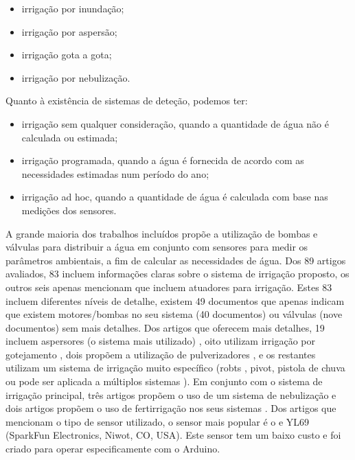 \documentclass[conference]{IEEEtran}
\begin{document}
\begin{itemize}
\item irrigação por inundação;
\item irrigação por aspersão;
\item irrigação gota a gota;
\item irrigação por nebulização.
\end{itemize}

Quanto à existência de sistemas de deteção, podemos ter:

\begin{itemize}
\item irrigação sem qualquer consideração, quando a quantidade de água não é calculada ou estimada;
\item irrigação programada, quando a água é fornecida de acordo com as necessidades estimadas num período do ano;
\item irrigação ad hoc, quando a quantidade de água é calculada com base nas medições dos sensores.
\end{itemize}

A grande maioria dos trabalhos incluídos propõe a utilização de
bombas e válvulas para distribuir a água em conjunto com sensores para medir os
parâmetros ambientais, a fim de calcular as necessidades de água. Dos 89
artigos avaliados, 83 incluem informações claras sobre o
sistema de irrigação proposto, os outros seis apenas mencionam que incluem
atuadores para irrigação. Estes 83 incluem diferentes níveis
de detalhe, existem 49 documentos que apenas indicam que existem motores/bombas
no seu sistema (40 documentos) ou válvulas (nove documentos) sem mais detalhes.
Dos artigos que oferecem mais detalhes, 19 incluem aspersores (o sistema
mais utilizado) \cite{gonzalez2018iot, ahmed2016intelligation, yusuf2005information, cambra2017iot, arvind2017automated, ammour2018factory, singh2019iot, wu2016secure, solanki2017conceptual, wasson2017integration, johar2018iot, ryu2015design, reche2014smart, chieochan2017internet, arumugam2018internet, boonchieng2018smart, rawal2017iot, guo2015design, khattab2016design},
oito utilizam irrigação por gotejamento \cite{daskalakis2018uw, nawandar2019iot, barkunan2019smart, sivaprasath2016arduino, kumar2017internet, kodali2016iot, abidin2015web, banumathi2017android}, dois propõem a
utilização de pulverizadores \cite{mechsy2017mobile}, e os restantes utilizam
um sistema de irrigação muito específico (robts \cite{rahul2018iot}, pivot,
pistola de chuva \cite{vasu2017intelligent} ou pode ser aplicada a múltiplos
sistemas \cite{agale2017automated}). Em conjunto com o sistema de irrigação principal,
três artigos propõem o uso de um sistema de nebulização \cite{chieochan2017internet, boonchieng2018smart, kodali2016iot} e dois artigos
propõem o uso de fertirrigação nos seus sistemas \cite{arumugam2018internet, abidin2015web}.
Dos artigos que mencionam o tipo de sensor utilizado, o sensor mais popular é o
e YL69 (SparkFun Electronics, Niwot, CO, USA). Este sensor tem um baixo custo e
foi criado para operar especificamente com o Arduino. \cite{garcia2020iot}
\end{document}
